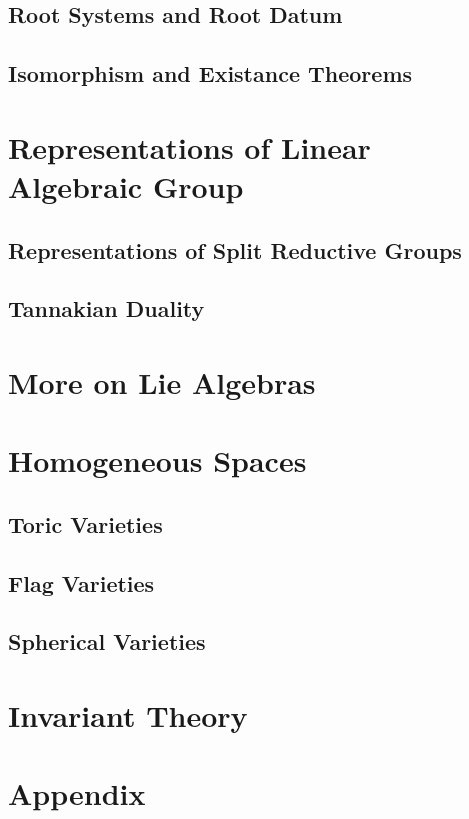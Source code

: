 \documentclass[10pt]{book}
\theoremstyle{bookplain}
\theoremstyle{bookdefinition}
\theoremstyle{bookremark}
\begin{document}
\section{Root Systems and Root Datum}

\section{Isomorphism and Existance Theorems}

\chapter{Representations of Linear Algebraic Group}
\section{Representations of Split Reductive Groups}
\section{Tannakian Duality}


\newpage

\chapter{More on Lie Algebras}
\chapter{Homogeneous Spaces}

\section{Toric Varieties}
\section{Flag Varieties}
\section{Spherical Varieties}

\chapter{Invariant Theory}

\appendix
\chapter{Appendix}

\backmatter
\printbibliography[heading=bibintoc,title={Bibliography}]
\end{document}
